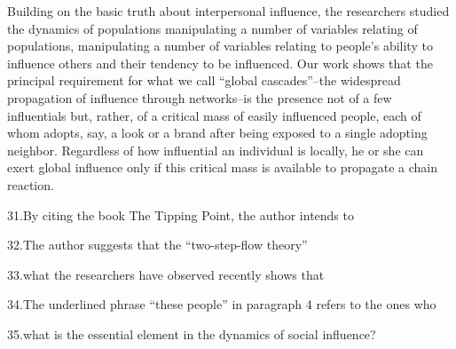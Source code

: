 \qquad Building on the basic truth about interpersonal influence, the researchers studied the dynamics of populations manipulating a number of variables relating of populations, manipulating a number of variables relating to people's ability to influence others and their tendency to be influenced. Our work shows that the principal requirement for what we call ``global cascades''--the widespread propagation of influence through networks--is the presence not of a few influentials but, rather, of a critical mass of easily influenced people, each of whom adopts, say, a look or a brand after being exposed to a single adopting neighbor. Regardless of how influential an individual is locally, he or she can exert global influence only if this critical mass is available to propagate a chain reaction.

31.By citing the book The Tipping Point, the author intends to\par

32.The author suggests that the “two-step-flow theory”\par

33.what the researchers have observed recently shows that\par

34.The underlined phrase “these people” in paragraph 4 refers to the ones who\par

35.what is the essential element in the dynamics of social influence?\par
